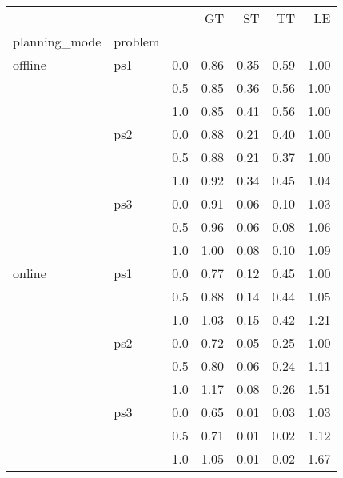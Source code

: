 \begin{tabular}{lllrrrr}
\toprule
       &     &     &   GT &   ST &   TT &   LE \\
planning\_mode & problem & {} &      &      &      &      \\
\midrule
offline & ps1 & 0.0 & 0.86 & 0.35 & 0.59 & 1.00 \\
       &     & 0.5 & 0.85 & 0.36 & 0.56 & 1.00 \\
       &     & 1.0 & 0.85 & 0.41 & 0.56 & 1.00 \\
       & ps2 & 0.0 & 0.88 & 0.21 & 0.40 & 1.00 \\
       &     & 0.5 & 0.88 & 0.21 & 0.37 & 1.00 \\
       &     & 1.0 & 0.92 & 0.34 & 0.45 & 1.04 \\
       & ps3 & 0.0 & 0.91 & 0.06 & 0.10 & 1.03 \\
       &     & 0.5 & 0.96 & 0.06 & 0.08 & 1.06 \\
       &     & 1.0 & 1.00 & 0.08 & 0.10 & 1.09 \\
online & ps1 & 0.0 & 0.77 & 0.12 & 0.45 & 1.00 \\
       &     & 0.5 & 0.88 & 0.14 & 0.44 & 1.05 \\
       &     & 1.0 & 1.03 & 0.15 & 0.42 & 1.21 \\
       & ps2 & 0.0 & 0.72 & 0.05 & 0.25 & 1.00 \\
       &     & 0.5 & 0.80 & 0.06 & 0.24 & 1.11 \\
       &     & 1.0 & 1.17 & 0.08 & 0.26 & 1.51 \\
       & ps3 & 0.0 & 0.65 & 0.01 & 0.03 & 1.03 \\
       &     & 0.5 & 0.71 & 0.01 & 0.02 & 1.12 \\
       &     & 1.0 & 1.05 & 0.01 & 0.02 & 1.67 \\
\bottomrule
\end{tabular}
